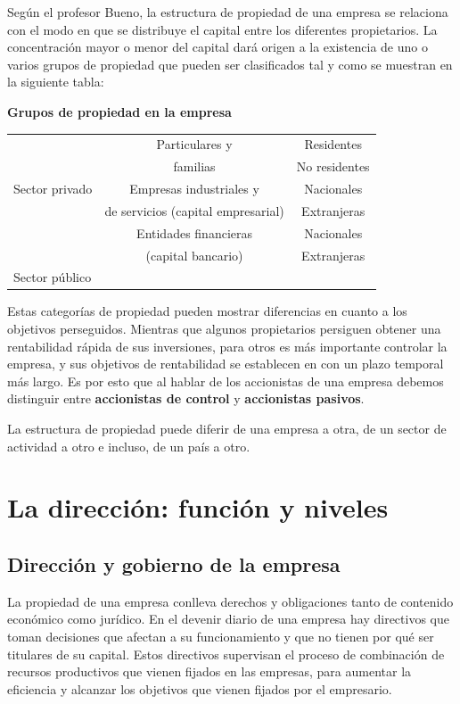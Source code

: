 \documentclass[12pt,a4paper,spanish]{report}
\begin{document}
		Según el profesor Bueno, la estructura de propiedad de una empresa se relaciona con el modo en que se distribuye el capital entre los diferentes propietarios. La concentración mayor o menor del capital dará origen a la existencia de uno o varios grupos de propiedad que pueden ser clasificados tal y como se muestran en la siguiente tabla:
		\begin{center}
			\textbf{Grupos de propiedad en la empresa}
			\begin{tabular}{| c | c | c |}
				\hline
				& Particulares y & Residentes \\ \cline{3-3}
				& familias & No residentes \\ \cline{2-3}
				Sector privado & Empresas industriales y &  Nacionales \\ \cline{3-3}
				& de servicios (capital empresarial) & Extranjeras \\ \cline{2-3}
				& Entidades financieras & Nacionales \\ \cline {3-3}
				& (capital bancario) & Extranjeras \\
				\hline
				\multicolumn{3}{|l|}{Sector público} \\
				\hline
			\end{tabular}
		\end{center}

		Estas categorías de propiedad pueden mostrar diferencias en cuanto a los objetivos perseguidos. Mientras que algunos propietarios persiguen obtener una rentabilidad rápida de sus inversiones, para otros es más importante controlar la empresa, y sus objetivos de rentabilidad se establecen en con un plazo temporal más largo. Es por esto que al hablar de los accionistas de una empresa debemos distinguir entre \textbf{accionistas de control} y \textbf{accionistas pasivos}.

		La estructura de propiedad puede diferir de una empresa a otra, de un sector de actividad a otro e incluso, de un país a otro.

	\section{\textcolor[rgb]{0.9,0.3,0.3}La dirección: función y niveles}
		\subsection{\textcolor[rgb]{0.9,0.3,0.3}Dirección y gobierno de la empresa}
			La propiedad de una empresa conlleva derechos y obligaciones tanto de contenido económico como jurídico. En el devenir diario de una empresa hay directivos que toman decisiones que afectan a su funcionamiento y que no tienen por qué ser titulares de su capital. Estos directivos supervisan el proceso de combinación de recursos productivos que vienen fijados en las empresas, para aumentar la eficiencia y alcanzar los objetivos que vienen fijados por el empresario.
\end{document}
